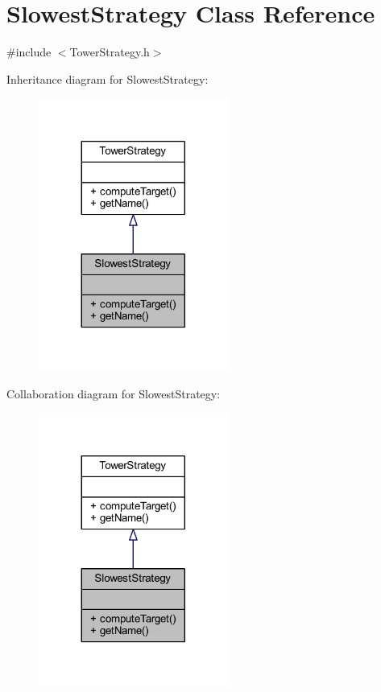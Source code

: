 \hypertarget{class_slowest_strategy}{\section{Slowest\+Strategy Class Reference}
\label{class_slowest_strategy}
}


{\ttfamily \#include $<$Tower\+Strategy.\+h$>$}



Inheritance diagram for Slowest\+Strategy\+:
\nopagebreak
\begin{figure}[H]
\begin{center}
\leavevmode
\includegraphics[width=176pt]{class_slowest_strategy__inherit__graph}
\end{center}
\end{figure}


Collaboration diagram for Slowest\+Strategy\+:
\nopagebreak
\begin{figure}[H]
\begin{center}
\leavevmode
\includegraphics[width=176pt]{class_slowest_strategy__coll__graph}
\end{center}
\end{figure}
